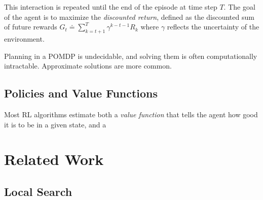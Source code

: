 This interaction is repeated until the end of the episode at time step \(T\).
The goal of the agent is to maximize the \textit{discounted return}, defined as the discounted sum of future rewards \(G_t \doteq \sum_{k=t+1}^T \gamma^{k-t-1} R_{k}\) where \(\gamma\) reflects the uncertainty of the environment.


Planning in a POMDP is undecidable, and solving them is often computationally intractable.
Approximate solutions are more common.


\subsection{Policies and Value Functions}

Most RL algorithms estimate both a \textit{value function} that tells the agent how good it is to be in a given state, and a 

\section{Related Work}

\subsection{Local Search}






